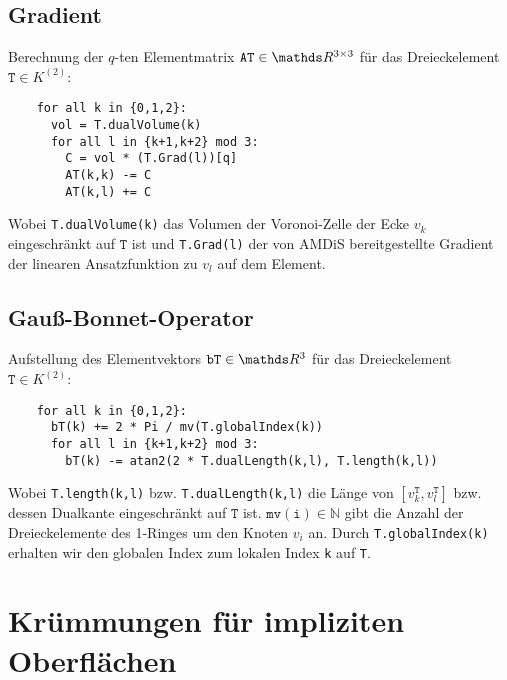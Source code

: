   \subsection{Gradient}
    \label{subsecAlgoGradient}
    Berechnung der \( q \)-ten Elementmatrix \( \mathtt{AT}\in\R^{3\times 3} \) für das Dreieckelement
    \( \mathtt{T}\in K^{(2)} \):
    \begin{verbatim}
    for all k in {0,1,2}:
      vol = T.dualVolume(k)
      for all l in {k+1,k+2} mod 3:
        C = vol * (T.Grad(l))[q]
        AT(k,k) -= C
        AT(k,l) += C
    \end{verbatim}
    Wobei \texttt{T.dualVolume(k)} das Volumen der Voronoi-Zelle der Ecke \( v_{k} \) eingeschränkt auf \(
   \mathtt{T} \) ist und \texttt{T.Grad(l)} der von AMDiS bereitgestellte Gradient der linearen Ansatzfunktion zu \( v_{l} \)
   auf dem Element.

 \subsection{Gauß-Bonnet-Operator}
  \label{subsecAlgoGaussBonnet}
    Aufstellung des Elementvektors \( \mathtt{bT}\in\R^{3} \) für das Dreieckelement
    \( \mathtt{T}\in K^{(2)} \):
    \begin{verbatim}
    for all k in {0,1,2}:
      bT(k) += 2 * Pi / mv(T.globalIndex(k))
      for all l in {k+1,k+2} mod 3:
        bT(k) -= atan2(2 * T.dualLength(k,l), T.length(k,l))
    \end{verbatim}
    Wobei \texttt{T.length(k,l)} bzw. \texttt{T.dualLength(k,l)} die Länge von
    \( \left[ v^{\mathtt{T}}_{k} , v^{\mathtt{T}}_{l} \right] \) bzw. dessen Dualkante eingeschränkt auf \(
    \mathtt{T} \) ist. 
    \( \mathtt{mv(i)}\in\mathds{N} \) gibt die Anzahl der Dreieckelemente des 1-Ringes um den Knoten \( v_{i} \) an.
    Durch \texttt{T.globalIndex(k)} erhalten wir den globalen Index zum lokalen Index \texttt{k} auf \texttt{T}.

\section{Krümmungen für impliziten Oberflächen}

